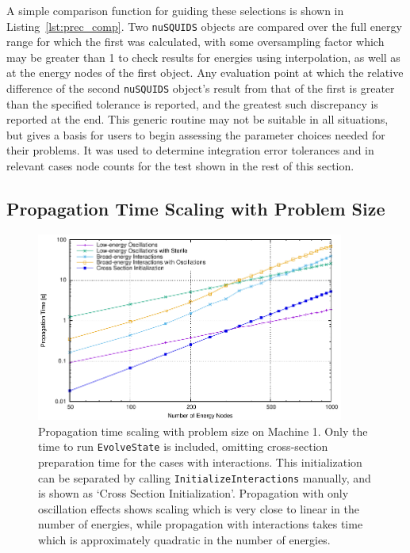 \documentclass[3p,12pt]{elsarticle}
\begin{document}
A simple comparison function for guiding these selections is shown in Listing~\ref{lst:prec_comp}. 
Two \lstinline{nuSQUIDS} objects are compared over the full energy range for which the first was calculated, with some oversampling factor which may be greater than 1 to check results for energies using interpolation, as well as at the energy nodes of the first object. 
Any evaluation point at which the relative difference of the second \lstinline{nuSQUIDS} object's result from that of the first is greater than the specified tolerance is reported, and the greatest such discrepancy is reported at the end. 
This generic routine may not be suitable in all situations, but gives a basis for users to begin assessing the parameter choices needed for their problems. 
It was used to determine integration error tolerances and in relevant cases node counts for the test shown in the rest of this section. 

\subsection{Propagation Time Scaling with Problem Size}
\label{ssec:propagation_scaling}

\begin{figure}[t]
  \centering
  \includegraphics[width=0.9\textwidth]{fig/propagation-scaling.pdf}
  \caption{Propagation time scaling with problem size on Machine 1. Only the time to run \lstinline{EvolveState} is included, omitting cross-section preparation time for the cases with interactions. This initialization can be separated by calling \lstinline{InitializeInteractions} manually, and is shown as `Cross Section Initialization'. Propagation with only oscillation effects shows scaling which is very close to linear in the number of energies, while propagation with interactions takes time which is approximately quadratic in the number of energies.}
  \label{fig:propagation_scaling}
\end{figure}
\end{document}
